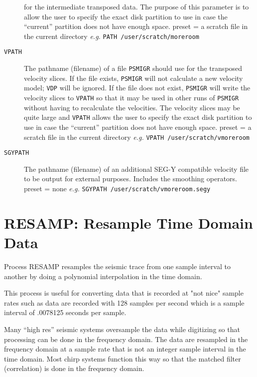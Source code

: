 \begin{description}
         for the intermediate transposed data.  The purpose of this
         parameter is to allow the user to specify the exact disk
         partition to use in case the ``current'' partition does not
         have enough space.
         preset = a scratch file in the current directory
         \textit{e.g.}    \texttt{PATH /user/scratch/moreroom}
\item[\texttt{VPATH}] The pathname (filename) of a file \texttt{PSMIGR} should use for the
         transposed velocity slices.  If the file exists, \texttt{PSMIGR} will
         not calculate a new velocity model; \texttt{VDP} will be ignored.  If
         the file does not exist, \texttt{PSMIGR} will write the velocity
         slices to \texttt{VPATH} so that it may be used in other runs of \texttt{PSMIGR}
         without having to recalculate the velocities.  The velocity
         slices may be quite large and \texttt{VPATH} allows the user to specify
         the exact disk partition to use in case the ``current'' partition
         does not have enough space.
         preset = a scratch file in the current directory
         \textit{e.g.}    \texttt{VPATH /user/scratch/vmoreroom}
\item[\texttt{SGYPATH}] The pathname (filename) of an additional SEG-Y compatible
         velocity file to be output for external purposes. Includes
         the smoothing operators.
         preset = none
         \textit{e.g.}    \texttt{SGYPATH /user/scratch/vmoreroom.segy}
\end{description}

\section{RESAMP: Resample Time Domain Data}
\label{cmd_resamp}

Process RESAMP resamples the seismic trace from one sample interval to
another by doing a polynomial interpolation in the time domain.

This process is useful for converting data that is recorded at "not
nice" sample rates such as data are recorded with 128 samples per
second which is a sample interval of .0078125 seconds per sample.

Many ``high res'' seismic systems oversample the data while digitizing
so that processing can be done in the frequency domain.  The data
are resampled in the frequency domain at a sample rate that is not
an integer sample interval in the time domain.  Most chirp systems
function this way so that the matched filter (correlation) is done
in the frequency domain.

